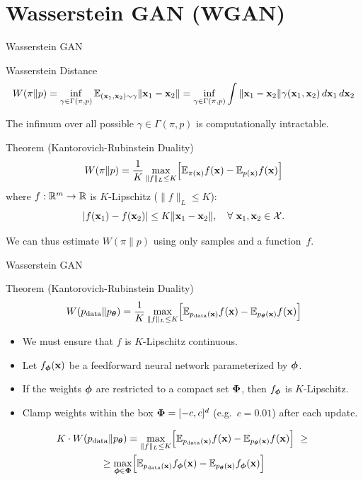 \documentclass{beamer}
\begin{document}
\section{Wasserstein GAN (WGAN)}
\begin{frame}{Wasserstein GAN}
	\begin{block}{Wasserstein Distance}
		\vspace{-0.5cm}
		\small
		\[
		W(\pi \| p) = \inf_{\gamma \in \Gamma(\pi, p)} \mathbb{E}_{(\mathbf{x}_1, \mathbf{x}_2) \sim \gamma} \| \mathbf{x}_1 - \mathbf{x}_2 \| =  \inf_{\gamma \in \Gamma(\pi, p)} \int \|\mathbf{x}_1 - \mathbf{x}_2\| \gamma (\mathbf{x}_1, \mathbf{x}_2)\, d\mathbf{x}_1\, d\mathbf{x}_2
		\]
		\vspace{-0.3cm}
	\end{block}
	\eqpause
	The infimum over all possible $\gamma \in \Gamma(\pi, p)$ is computationally intractable.
	\eqpause
	\begin{block}{Theorem (Kantorovich-Rubinstein Duality)}
		\vspace{-0.3cm}
		\[
			W(\pi \| p) = \frac{1}{K} \max_{\| f \|_L \leq K} \Bigl[ \mathbb{E}_{\pi(\mathbf{x})} f(\mathbf{x})  - \mathbb{E}_{p(\mathbf{x})} f(\mathbf{x})\Bigr]
		\]
		where $f : \mathbb{R}^m \rightarrow \mathbb{R}$ is $K$-Lipschitz ($\|f\|_L \leq K$):
		\[
			|f(\mathbf{x}_1) - f(\mathbf{x}_2)| \leq K \|\mathbf{x}_1 - \mathbf{x}_2\|,\quad \forall\ \mathbf{x}_1, \mathbf{x}_2 \in \mathcal{X}.
		\]
		\vspace{-0.6cm}
	\end{block}
	\eqpause
	We can thus estimate $W(\pi \| p)$ using only samples and a function~$f$.
\end{frame}
\begin{frame}{Wasserstein GAN}
	\begin{block}{Theorem (Kantorovich-Rubinstein Duality)}
		\[
		W(p_{\text{data}} \| p_{\boldsymbol{\theta}}) = \frac{1}{K} \max_{\| f \|_L \leq K} \Bigl[ \mathbb{E}_{p_{\text{data}}(\mathbf{x})} f(\mathbf{x})  - \mathbb{E}_{p_{\boldsymbol{\theta}}(\mathbf{x})} f(\mathbf{x})\Bigr]
		\]
	\end{block}
	\begin{itemize}
		\item We must ensure that $f$ is $K$-Lipschitz continuous.
		\item Let $f_{\boldsymbol{\phi}}(\mathbf{x})$ be a feedforward neural network parameterized by $\boldsymbol{\phi}$.
		\item If the weights $\boldsymbol{\phi}$ are restricted to a compact set $\boldsymbol{\Phi}$, then $f_{\boldsymbol{\phi}}$ is $K$-Lipschitz.
		\eqpause
		\item Clamp weights within the box $\boldsymbol{\Phi} = [-c, c]^d$ (e.g.\ $c = 0.01$) after each update.
	\end{itemize}
	\begin{multline*}
		K \cdot W(\pd \| \pt) = \max_{\| f \|_L \leq K} \Bigl[ \bbE_{\pd(\bx)} f(\bx)  - \bbE_{\pt(\bx)} f(\bx)\Bigr]\ \geq\ 
		\\  \geq \max_{\bphi \in \bPhi} \Bigl[ \bbE_{\pd(\bx)} f_{\bphi}(\bx)  - \bbE_{\pt(\bx)} f_{\bphi}(\bx)\Bigr]
	\end{multline*}
\end{frame}
\end{document}
